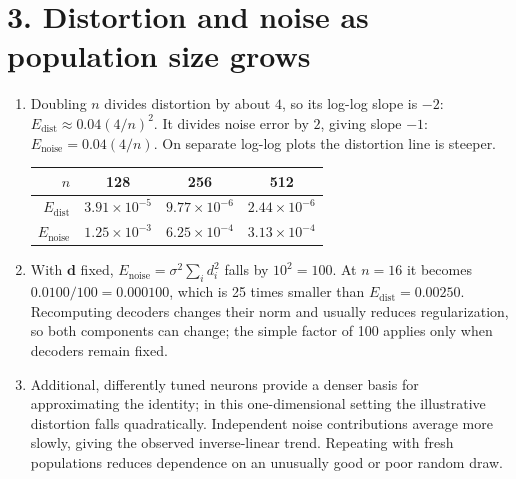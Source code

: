 \documentclass[10pt,letterpaper]{article}
\newcommand{\vct}[1]{\boldsymbol{#1}}
\begin{document}
\section*{3. Distortion and noise as population size grows}
\begin{enumerate}[label=\textbf{3\alph*.}]
\item Doubling \(n\) divides distortion by about \(4\), so its log-log slope is \(-2\): \(E_{\mathrm{dist}}\approx0.04(4/n)^2\). It divides noise error by \(2\), giving slope \(-1\): \(E_{\mathrm{noise}}=0.04(4/n)\). On separate log-log plots the distortion line is steeper.
\begin{center}\begin{tabular}{rccc}\toprule \(n\) & 128 & 256 & 512\\\midrule
\(E_{\mathrm{dist}}\) & \(3.91\times10^{-5}\) & \(9.77\times10^{-6}\) & \(2.44\times10^{-6}\)\\
\(E_{\mathrm{noise}}\) & \(1.25\times10^{-3}\) & \(6.25\times10^{-4}\) & \(3.13\times10^{-4}\)\\\bottomrule\end{tabular}\end{center}
\item With \(\vct{d}\) fixed, \(E_{\mathrm{noise}}=\sigma^2\sum_i d_i^2\) falls by \(10^2=100\). At \(n=16\) it becomes \(0.0100/100=0.000100\), which is 25 times smaller than \(E_{\mathrm{dist}}=0.00250\). Recomputing decoders changes their norm and usually reduces regularization, so both components can change; the simple factor of 100 applies only when decoders remain fixed.
\item Additional, differently tuned neurons provide a denser basis for approximating the identity; in this one-dimensional setting the illustrative distortion falls quadratically. Independent noise contributions average more slowly, giving the observed inverse-linear trend. Repeating with fresh populations reduces dependence on an unusually good or poor random draw.
\end{enumerate}
\end{document}
